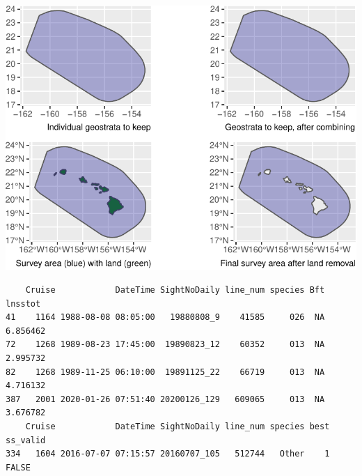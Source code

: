 \documentclass[
]{book}
\begin{document}
\includegraphics{figures/unnamed-chunk-238-1.pdf}

\begin{verbatim}
    Cruise            DateTime SightNoDaily line_num species Bft  lnsstot
41    1164 1988-08-08 08:05:00   19880808_9    41585     026  NA 6.856462
72    1268 1989-08-23 17:45:00  19890823_12    60352     013  NA 2.995732
82    1268 1989-11-25 06:10:00  19891125_22    66719     013  NA 4.716132
387   2001 2020-01-26 07:51:40 20200126_129   609065     013  NA 3.676782
    Cruise            DateTime SightNoDaily line_num species best ss_valid
334   1604 2016-07-07 07:15:57 20160707_105   512744   Other    1    FALSE
\end{verbatim}
\end{document}
